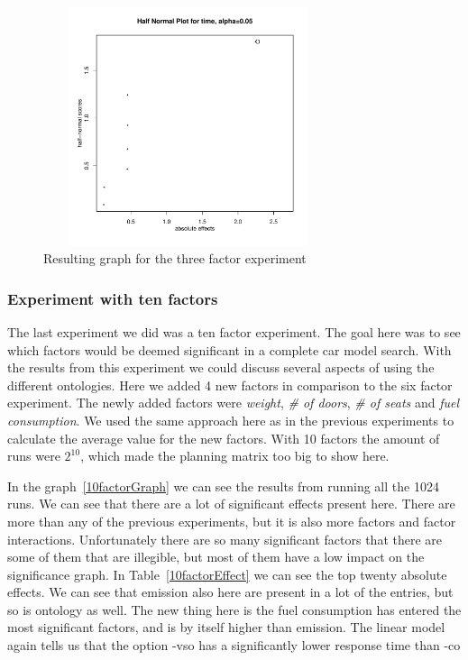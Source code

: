 \documentclass{llncs}
\begin{document}
\begin{figure}
 \includegraphics[width=8.5cm, height=7cm]{2factorfinal.pdf}
  \caption{Resulting graph for the three factor experiment}\label{3factorGraph}
\end{figure}


\subsubsection{Experiment with ten factors}
The last experiment we did was a ten factor experiment. The goal here
was to see which factors would be deemed significant in a complete car
model search. With the results from this experiment we could discuss
several aspects of using the different ontologies.  Here we added 4
new factors in comparison to the six factor experiment. The newly
added factors were \emph{weight}, \emph{\# of doors},
\emph{\# of seats} and \emph{fuel consumption}. We used the same
approach here as in the previous experiments to calculate the average
value for the new factors. %
With 10 factors the amount of
runs were $2^{10}$, which made the planning matrix too big to show here.

In the graph~\ref{10factorGraph} we can see the results from running
all the 1024 runs.  We can see that there are a lot of significant
effects present here. There are more than any of the previous
experiments, but it is also more factors and factor interactions.
Unfortunately there are so many significant factors that there are
some of them that are illegible, but most of them have a low impact on
the significance graph.  In Table~\ref{10factorEffect} we can see the top
twenty absolute effects. We can see that emission also here are present in a lot of the
entries, but so is ontology as well. The new thing here is the fuel
consumption has entered the most significant factors, and is by itself
higher than emission. The linear model again tells us that the option
\textsf{-vso} has a significantly lower response time than
\textsf{-co}
\end{document}
